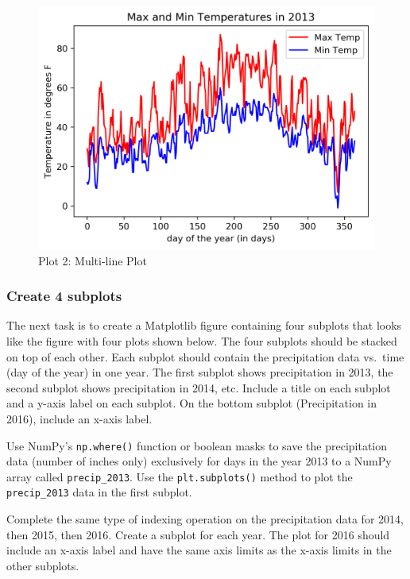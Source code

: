 \documentclass[11pt]{article}
\makeatletter
\def\maxwidth{\ifdim\Gin@nat@width>\linewidth\linewidth
    \else\Gin@nat@width\fi}
\let\Oldincludegraphics\includegraphics
\renewcommand{\includegraphics}[1]{\Oldincludegraphics[width=.8\maxwidth]{#1}}
\makeatother
\begin{document}
\begin{figure}[h!]
\centering
\includegraphics{images/plot2.png}
\caption{Plot 2: Multi-line Plot}
\end{figure}

    \hypertarget{create-4-subplots}{%
\subsubsection{Create 4 subplots}\label{create-4-subplots}}

The next task is to create a Matplotlib figure containing four subplots
that looks like the figure with four plots shown below. The four
subplots should be stacked on top of each other. Each subplot should
contain the precipitation data vs.~time (day of the year) in one year.
The first subplot shows precipitation in 2013, the second subplot shows
precipitation in 2014, etc. Include a title on each subplot and a y-axis
label on each subplot. On the bottom subplot (Precipitation in 2016),
include an x-axis label.

Use NumPy's \texttt{np.where()} function or boolean masks to save the
precipitation data (number of inches only) exclusively for days in the
year 2013 to a NumPy array called \texttt{precip\_2013}. Use the
\texttt{plt.subplots()} method to plot the \texttt{precip\_2013} data in
the first subplot.

Complete the same type of indexing operation on the precipitation data
for 2014, then 2015, then 2016. Create a subplot for each year. The plot
for 2016 should include an x-axis label and have the same axis limits as
the x-axis limits in the other subplots.
\end{document}
